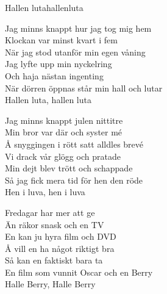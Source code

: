 \begin{song}{Hallen luta}{hallenluta}
\begin{vers}
Jag minns knappt hur jag tog mig hem\\
Klockan var minst kvart i fem\\
När jag stod utanför min egen våning\\
Jag lyfte upp min nyckelring\\
Och haja nästan ingenting\\
När dörren öppnas står min hall och lutar\\
\repopen Hallen luta, hallen luta \repclose\\
\end{vers}
\begin{vers}
Jag minns knappt julen nittitre\\
Min bror var där och syster mé\\
Å snyggingen i rött satt alldles brevé\\
Vi drack vår glögg och pratade\\
Min dejt blev trött och schappade\\
Så jag fick mera tid för hen den röde\\
\repopen Hen i luva, hen i luva \repclose\\
\end{vers}
\begin{vers}
Fredagar har mer att ge\\
Än räkor snask och en TV\\
En kan ju hyra film och DVD\\
Å vill en ha något riktigt bra\\
Så kan en faktiskt bara ta\\
En film som vunnit Oscar och en Berry\\
\repopen Halle Berry, Halle Berry \repclose\\
\end{vers}
\end{song}